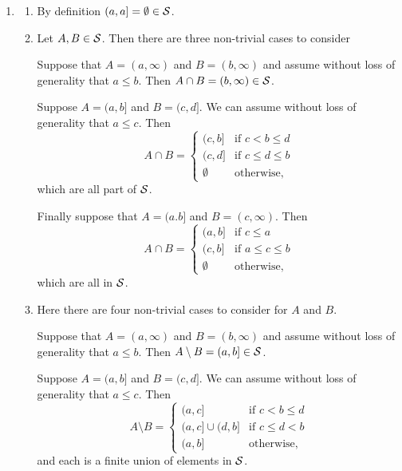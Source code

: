 \begin{enumerate}[label=(\alph*)]
\item 
\begin{enumerate}[label=\arabic*.]
\item By definition $(a,a] = \emptyset \in \mathcal S$.
\item Let $A, B \in \mathcal S$. Then there are three non-trivial cases to consider

Suppose that $A = (a, \infty)$ and $B = (b, \infty)$ and assume without loss of generality that $a \le b$. Then $A \cap B = (b,\infty) \in \mathcal S$.

Suppose $A = (a,b]$ and $B = (c, d]$. We can assume without loss of generality that $a \le c$. Then
\[
	A \cap B = \begin{cases}
		(c,b] &\text{if } c < b \le d\\
		(c,d] &\text{if } c \le d \le b\\
		\emptyset &\text{otherwise},
	\end{cases}
\]
which are all part of $\mathcal S$.

Finally suppose that $A = (a.b]$ and $B = (c,\infty)$. Then
\[
	A \cap B = \begin{cases}
		(a,b] &\text{if } c \le a\\
		(c,b] &\text{if } a \le c \le b\\
		\emptyset &\text{otherwise},
	\end{cases}
\]
which are all in $\mathcal S$.
\item Here there are four non-trivial cases to consider for $A$ and $B$.

Suppose that $A = (a, \infty)$ and $B = (b, \infty)$ and assume without loss of generality that $a \le b$. Then $A \setminus B = (a,b] \in \mathcal S$.

Suppose $A = (a,b]$ and $B = (c, d]$. We can assume without loss of generality that $a \le c$. Then
\[
	A \setminus B = \begin{cases}
			(a,c] &\text{if } c < b \le d \\
			(a,c] \cup (d,b] &\text{if } c \le d < b\\
			(a,b] &\text{otherwise},
		\end{cases}
\]
and each is a finite union of elements in $\mathcal S$.


\end{enumerate}
\end{enumerate}
